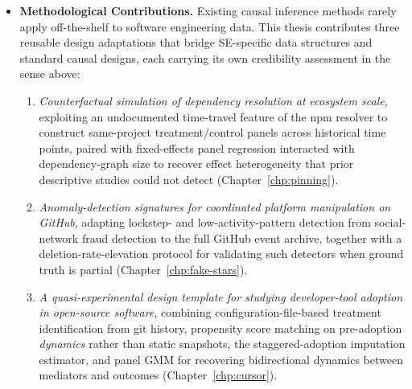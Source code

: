 \begin{itemize}[leftmargin=15pt]
    \item \textbf{Methodological Contributions.} Existing causal inference methods rarely apply off-the-shelf to software engineering data.
    This thesis contributes three reusable design adaptations that bridge SE-specific data structures and standard causal designs, each carrying its own credibility assessment in the sense above:
    \begin{enumerate}[leftmargin=15pt, label=(\alph*)]
        \item \emph{Counterfactual simulation of dependency resolution at ecosystem scale}, exploiting an undocumented time-travel feature of the npm resolver to construct same-project treatment/control panels across historical time points, paired with fixed-effects panel regression interacted with dependency-graph size to recover effect heterogeneity that prior descriptive studies could not detect (Chapter~\ref{chp:pinning}).
        \item \emph{Anomaly-detection signatures for coordinated platform manipulation on GitHub}, adapting lockstep- and low-activity-pattern detection from social-network fraud detection to the full GitHub event archive, together with a deletion-rate-elevation protocol for validating such detectors when ground truth is partial (Chapter~\ref{chp:fake-stars}).
        \item \emph{A quasi-experimental design template for studying developer-tool adoption in open-source software}, combining configuration-file-based treatment identification from git history, propensity score matching on pre-adoption \emph{dynamics} rather than static snapshots, the \citet{borusyak2024revisiting} staggered-adoption imputation estimator, and panel GMM for recovering bidirectional dynamics between mediators and outcomes (Chapter~\ref{chp:cursor}).
    \end{enumerate}


\end{itemize}
